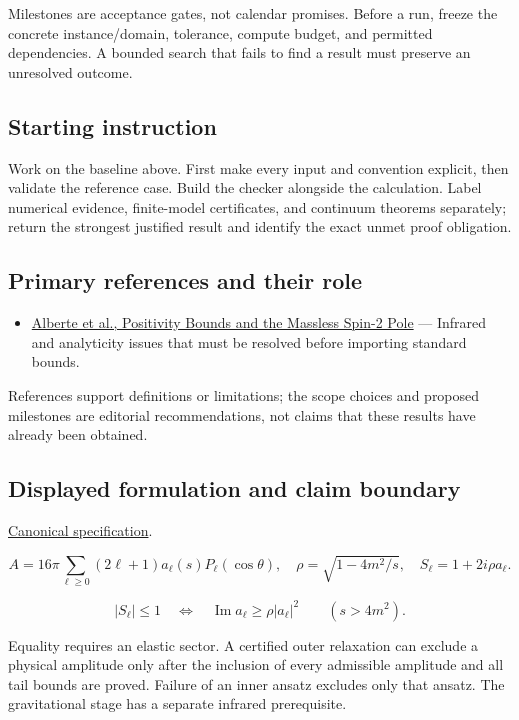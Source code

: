 \documentclass[
  11pt,
]{article}
\providecommand{\tightlist}{%
  \setlength{\itemsep}{0pt}\setlength{\parskip}{0pt}}
\begin{document}
Milestones are acceptance gates, not calendar promises. Before a run,
freeze the concrete instance/domain, tolerance, compute budget, and
permitted dependencies. A bounded search that fails to find a result
must preserve an unresolved outcome.

\subsection{Starting instruction}

Work on the baseline above. First make every input and convention
explicit, then validate the reference case. Build the checker alongside
the calculation. Label numerical evidence, finite-model certificates,
and continuum theorems separately; return the strongest justified result
and identify the exact unmet proof obligation.

\subsection{Primary references and their role}

\begin{itemize}
\tightlist
\item
  \href{https://arxiv.org/abs/2007.12667}{Alberte et al., Positivity
  Bounds and the Massless Spin-2 Pole} --- Infrared and analyticity
  issues that must be resolved before importing standard bounds.
\end{itemize}

References support definitions or limitations; the scope choices and
proposed milestones are editorial recommendations, not claims that these
results have already been obtained.

\subsection{Displayed formulation and claim boundary}

\href{https://github.com/rick-stevens-ai/Pure-Thought/blob/main/PRDs/06-Nonperturbative-S-matrix-Bootstrap.md}{Canonical
specification}.

\[A=16\pi\sum_{\ell\ge0}(2\ell+1)a_\ell(s)P_\ell(\cos\theta),\quad
\rho=\sqrt{1-4m^2/s},\quad S_\ell=1+2i\rho a_\ell.\]

\[|S_\ell|\le1\quad\Longleftrightarrow\quad
\operatorname{Im}a_\ell\ge\rho|a_\ell|^2\qquad(s>4m^2).\]

Equality requires an elastic sector. A certified outer relaxation can
exclude a physical amplitude only after the inclusion of every
admissible amplitude and all tail bounds are proved. Failure of an inner
ansatz excludes only that ansatz. The gravitational stage has a separate
infrared prerequisite.
\end{document}
